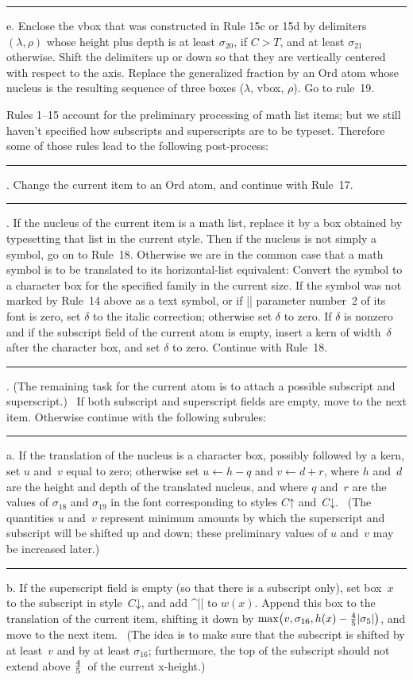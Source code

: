 \rule 15e. Enclose the vbox that was constructed in Rule 15c or 15d by
delimiters $(\lambda,\rho)$
whose height plus depth is at least $\sigma_{20}$, if $C>T$, and at
least $\sigma_{21}$ otherwise. Shift the delimiters up or down so that they are
vertically centered with respect to the axis. Replace the generalized
fraction by an Ord atom whose nucleus is the resulting sequence of three boxes
($\lambda$, vbox, $\rho$). Go to rule~19.

\bigbreak\noindent
Rules 1--15 account for the preliminary processing of math list items;
but we still haven't specified how subscripts and superscripts are to be
typeset. Therefore some of those rules lead to the following post-process:

\rule 16. Change the current item to an Ord atom, and continue with Rule~17.

\rule 17. If the nucleus of the current item is a math list, replace it by
a box obtained by typesetting that list in the current style.  Then if the
nucleus is not simply a symbol, go on to Rule~18.  Otherwise we are in the
common case that a math symbol is to be translated to its horizontal-list
equivalent: Convert the symbol to a character box for the specified family
in the current size. If the symbol was not marked by Rule~14 above as a
text symbol, or if\/ |\fontdimen| parameter number~2 of its font is zero, set
$\delta$ to the italic correction; otherwise set $\delta$ to zero. If
$\delta$ is nonzero and if the subscript field of the current atom is
empty, insert a kern of width~$\delta$ after the character box, and set
$\delta$ to zero. Continue with Rule~18.

\rule 18. (The remaining task for the current atom is to attach a possible
subscript and superscript.) \ If both subscript and superscript fields
are empty, move to the next item. Otherwise continue with the following
subrules:

\rule 18a. If the translation of the nucleus is a character box, possibly
followed by a kern, set $u$ and~$v$ equal to zero; otherwise set
$u\leftarrow h-q$ and $v\leftarrow d+r$, where $h$ and~$d$ are the height
and depth of the translated nucleus, and where $q$ and~$r$ are the values
of $\sigma_{18}$ and $\sigma_{19}$ in the font corresponding to styles
$C\mathord\uparrow$ and~$C\mathord\downarrow$.  \ (The quantities $u$
and~$v$ represent minimum amounts by which the superscript and subscript
will be shifted up and down; these preliminary values of $u$ and~$v$ may
be increased later.)

\rule 18b. If the superscript field is empty (so that there is a subscript
only), set box~$x$ to the subscript in style~$C\mathord\downarrow$, and add
^|\scriptspace| to $w(x)$. Append this box to the translation of the
current item, shifting it down by $\max\bigl(v,\sigma_{16},h(x)-{4\over5}
\vert\sigma_5\vert\bigr)$, and move to the next item. \ (The idea is
to make sure that the subscript is shifted by at least~$v$ and by at
least $\sigma_{16}$; furthermore, the top of the subscript should not extend
above $4\over5$~of the current x-height.)

